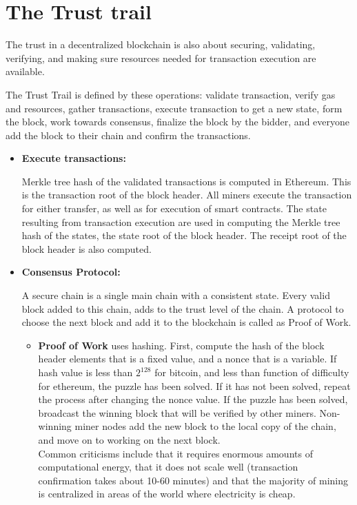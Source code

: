 \documentclass{article}
\begin{document}
 \section{The Trust trail}
 The trust in a decentralized blockchain is also about securing, validating, verifying, and making sure resources needed for transaction execution are available.\\ \par
 The Trust Trail is defined by these operations: validate transaction, verify gas and resources, gather transactions, execute transaction to get a new state, form the block, work towards consensus, finalize the block by the bidder, and everyone add the block to their chain and confirm the transactions.
 \begin{itemize}
     \item \textbf{Execute transactions:} \par Merkle tree hash of the validated transactions is computed in Ethereum. This is the transaction root of the block header. All miners execute the transaction for either transfer, as well as for execution of smart contracts. The state resulting from transaction execution are used in computing the Merkle tree hash of the states, the state root of the block header. The receipt root of the block header is also computed.
     \item \textbf{Consensus Protocol:} \par A secure chain is a single main chain with a consistent state. Every valid block added to this chain, adds to the trust level of the chain. A protocol to choose the next block and add it to the blockchain is called as Proof of Work.\\
     \begin{itemize}
         \item \textbf{Proof of Work} uses hashing. First, compute the hash of the block header elements that is a fixed value, and a nonce that is a variable. If hash value is less than $2^{128}$ for bitcoin, and less than function of difficulty for ethereum, the puzzle has been solved. If it has not been solved, repeat the process after changing the nonce value. If the puzzle has been solved, broadcast the winning block that will be verified by other miners. Non-winning miner nodes add the new block to the local copy of the chain, and move on to working on the next block. \\ Common criticisms include that it requires enormous amounts of computational energy, that it does not scale well (transaction confirmation takes about 10-60 minutes) and that the majority of mining is centralized in areas of the world where electricity is cheap. \par
         

\end{itemize}
\end{itemize}
\end{document}
